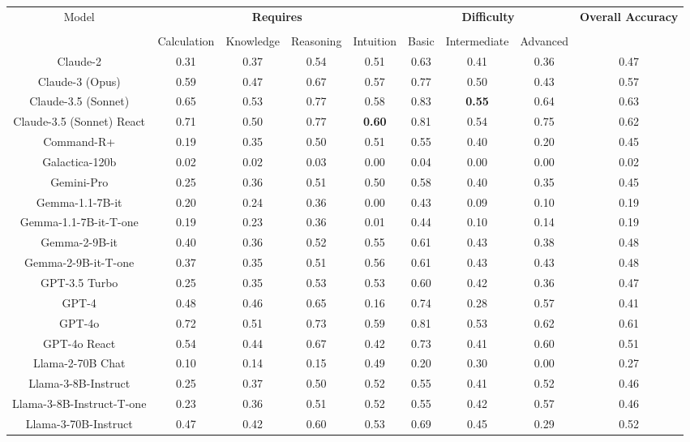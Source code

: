 \begin{tabular}{ccccccccc}
\toprule
\multirow{3}{*}{Model} & \multicolumn{4}{c}{\textbf{Requires}} & \multicolumn{3}{c}{\textbf{Difficulty}} & \multirow{3}{*}{\textbf{Overall Accuracy}}\\\cmidrule(lr){2-5} \cmidrule(lr){6-8}\\
 & Calculation & Knowledge & Reasoning & Intuition & Basic & Intermediate & Advanced &  \\
\midrule
Claude-2 & 0.31 & 0.37 & 0.54 & 0.51 & 0.63 & 0.41 & 0.36 & 0.47 \\
Claude-3 (Opus) & 0.59 & 0.47 & 0.67 & 0.57 & 0.77 & 0.50 & 0.43 & 0.57 \\
Claude-3.5 (Sonnet) & 0.65 & 0.53 & 0.77 & 0.58 & 0.83 & \textbf{0.55} & 0.64 & 0.63 \\
Claude-3.5 (Sonnet) React & 0.71 & 0.50 & 0.77 & \textbf{0.60} & 0.81 & 0.54 & 0.75 & 0.62 \\
Command-R+ & 0.19 & 0.35 & 0.50 & 0.51 & 0.55 & 0.40 & 0.20 & 0.45 \\
Galactica-120b & 0.02 & 0.02 & 0.03 & 0.00 & 0.04 & 0.00 & 0.00 & 0.02 \\
Gemini-Pro & 0.25 & 0.36 & 0.51 & 0.50 & 0.58 & 0.40 & 0.35 & 0.45 \\
Gemma-1.1-7B-it & 0.20 & 0.24 & 0.36 & 0.00 & 0.43 & 0.09 & 0.10 & 0.19 \\
Gemma-1.1-7B-it-T-one & 0.19 & 0.23 & 0.36 & 0.01 & 0.44 & 0.10 & 0.14 & 0.19 \\
Gemma-2-9B-it & 0.40 & 0.36 & 0.52 & 0.55 & 0.61 & 0.43 & 0.38 & 0.48 \\
Gemma-2-9B-it-T-one & 0.37 & 0.35 & 0.51 & 0.56 & 0.61 & 0.43 & 0.43 & 0.48 \\
GPT-3.5 Turbo & 0.25 & 0.35 & 0.53 & 0.53 & 0.60 & 0.42 & 0.36 & 0.47 \\
GPT-4 & 0.48 & 0.46 & 0.65 & 0.16 & 0.74 & 0.28 & 0.57 & 0.41 \\
GPT-4o & 0.72 & 0.51 & 0.73 & 0.59 & 0.81 & 0.53 & 0.62 & 0.61 \\
GPT-4o React & 0.54 & 0.44 & 0.67 & 0.42 & 0.73 & 0.41 & 0.60 & 0.51 \\
Llama-2-70B Chat & 0.10 & 0.14 & 0.15 & 0.49 & 0.20 & 0.30 & 0.00 & 0.27 \\
Llama-3-8B-Instruct & 0.25 & 0.37 & 0.50 & 0.52 & 0.55 & 0.41 & 0.52 & 0.46 \\
Llama-3-8B-Instruct-T-one & 0.23 & 0.36 & 0.51 & 0.52 & 0.55 & 0.42 & 0.57 & 0.46 \\
Llama-3-70B-Instruct & 0.47 & 0.42 & 0.60 & 0.53 & 0.69 & 0.45 & 0.29 & 0.52 \\

\end{tabular}
